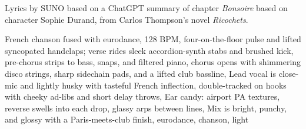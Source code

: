 
\begin{notes}
Lyrics by SUNO based on a ChatGPT summary of chapter \emph{Bonsoire} based on character Sophie Durand, from Carlos Thompson's novel \emph{Ricochets}.
\end{notes}
\begin{style}
French chanson fused with eurodance, 128 BPM, four-on-the-floor pulse and lifted syncopated handclaps; verse rides sleek accordion-synth stabs and brushed kick, pre-chorus strips to bass, snaps, and filtered piano, chorus opens with shimmering disco strings, sharp sidechain pads, and a lifted club bassline, Lead vocal is close-mic and lightly husky with tasteful French inflection, double-tracked on hooks with cheeky ad-libs and short delay throws, Ear candy: airport PA textures, reverse swells into each drop, glassy arps between lines, Mix is bright, punchy, and glossy with a Paris-meets-club finish, eurodance, chanson, light
\end{style}
